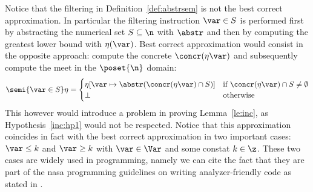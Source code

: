 Notice that the filtering in Definition~\ref{def:abstrsem} is not the
best correct approximation. In particular the filtering instruction
\(\var\in S\) is performed first by abstracting the numerical set
\(S \subseteq \n\) with \(\abstr\) and then by computing the greatest
lower bound with \(\eta(\var)\). Best correct approximation would
consist in the opposite approach: compute the concrete
\(\concr(\eta\var)\) and subsequently compute the meet in the
\(\poset{\n}\) domain:
\begin{equation*}
  \semi{\var\in S}\eta = \begin{cases}
    \eta[\var \mapsto \abstr(\concr(\eta\var) \cap S)] & \text{if } \concr(\eta\var) \cap S \neq \emptyset \\
    \bot & \text{otherwise}
  \end{cases}
\end{equation*}
This however would introduce a problem in proving Lemma~\ref{le:inc},
as Hypothesis~\ref{inc:hp1} would not be respected.  Notice that this
approximation coincides in fact with the best correct approximation in
two important cases: \(\var \leq k\) and \(\var \geq k\) with
\(\var\in\Var\) and some constat \(k\in\z\). These two cases are
widely used in programming, namely we can cite the fact that they are
part of the nasa programming guidelines on writing analyzer-friendly
code as stated in \cite{nasa:ten}.
